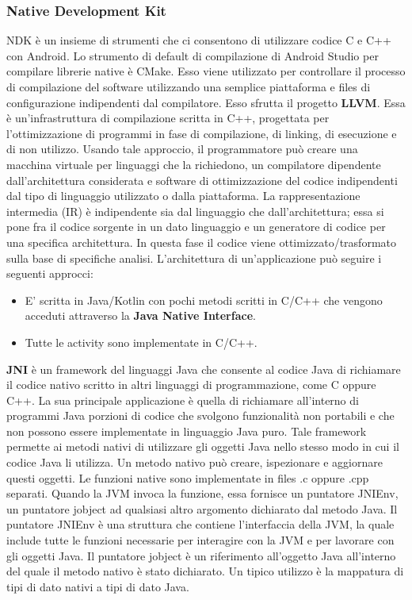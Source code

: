 \subsubsection{Native Development Kit}
NDK è un insieme di strumenti che ci consentono di utilizzare codice C e C++ con Android. Lo strumento di default di compilazione di Android Studio per compilare librerie native è CMake. Esso viene utilizzato per controllare il processo di compilazione del software utilizzando una semplice piattaforma e files di configurazione indipendenti dal compilatore. Esso sfrutta il progetto \textbf{LLVM}. Essa è un'infrastruttura di compilazione scritta in C++, progettata per l'ottimizzazione di programmi in fase di compilazione, di linking, di esecuzione e di non utilizzo. Usando tale approccio, il programmatore può creare una macchina virtuale per linguaggi che la richiedono, un compilatore dipendente dall'architettura considerata e software di ottimizzazione del codice indipendenti dal tipo di linguaggio utilizzato o dalla piattaforma. La rappresentazione intermedia (IR) è indipendente sia dal linguaggio che dall'architettura; essa si pone fra il codice sorgente in un dato linguaggio e un generatore di codice per una specifica architettura. In questa fase il codice viene ottimizzato/trasformato sulla base di specifiche analisi. L'architettura di un'applicazione può seguire i seguenti approcci:
\begin{itemize}
\item E' scritta in Java/Kotlin con pochi metodi scritti in C/C++ che vengono acceduti attraverso la \textbf{Java Native Interface}.
\item Tutte le activity sono implementate in C/C++.
\end{itemize}
\textbf{JNI} è un framework del linguaggi Java che consente al codice Java di richiamare il codice nativo scritto in altri linguaggi di programmazione, come C oppure C++. La sua principale applicazione è quella di richiamare all'interno di programmi Java porzioni di codice che svolgono funzionalità non portabili e che non possono essere implementate in linguaggio Java puro. Tale framework permette ai metodi nativi di utilizzare gli oggetti Java nello stesso modo in cui il codice Java li utilizza. Un metodo nativo può creare, ispezionare e aggiornare questi oggetti. Le funzioni native sono implementate in files .c oppure .cpp separati. Quando la JVM invoca la funzione, essa fornisce un puntatore JNIEnv, un puntatore jobject ad qualsiasi altro argomento dichiarato dal metodo Java. Il puntatore JNIEnv è una struttura che contiene l'interfaccia della JVM, la quale include tutte le funzioni necessarie per interagire con la JVM e per lavorare con gli oggetti Java. Il puntatore jobject è un riferimento all'oggetto Java all'interno del quale il metodo nativo è stato dichiarato. Un tipico utilizzo è la mappatura di tipi di dato nativi a tipi di dato Java.
